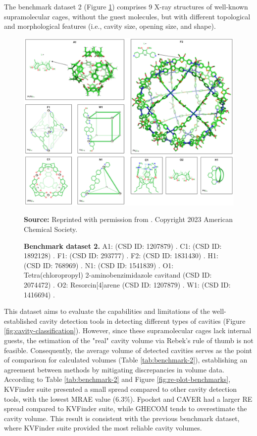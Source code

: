 \documentclass[Ingles]{phdthesis}
\def\ie{i.e.\onedot}
\begin{document}
The benchmark dataset 2 (Figure \ref{fig:benchmark-dataset-2}) comprises 9 X-ray structures of well-known supramolecular cages, without the guest molecules, but with different topological and morphological features (\ie, cavity size, opening size, and shape).

\begin{figure}[ht]
  \centerline{\includegraphics[scale=1]{images/benchmark-dataset-2.png}}
  \centerline{\tiny{\textbf{Source:} Reprinted with permission from \cite{guerra2023B}. Copyright 2023 American Chemical Society.}}
  \caption[Benchmark dataset 2]{\textbf{Benchmark dataset 2.}
  A1:  (CSD ID: 1207879) \cite{macgillivray1997}.
  C1:  (CSD ID: 1892128) \cite{kawakami2019}.
  F1:  (CSD ID: 293777) \cite{yoshizawa2006}.
  F2:  (CSD ID: 1831430) \cite{fujita2016}.
  H1:  (CSD ID: 768969) \cite{liao2010}.
  N1:  (CSD ID: 1541839) \cite{ronson2017}.
  O1: Tetra(chloropropyl) 2-aminobenzimidazole cavitand (CSD ID: 2074472) \cite{zhang2021}.
  O2: Resorcin[4]arene (CSD ID: 1207879) \cite{macgillivray1997}.
  W1:  (CSD ID: 1416694) \cite{cullen2016}.}
  \label{fig:benchmark-dataset-2}
\end{figure}

This dataset aims to evaluate the capabilities and limitations of the well-established cavity detection tools in detecting different types of cavities (Figure \ref{fig:cavity-classification}). However, since these supramolecular cages lack internal guests, the estimation of the "real" cavity volume via Rebek's rule of thumb is not feasible. Consequently, the average volume of detected cavities serves as the point of comparison for calculated volumes (Table \ref{tab:benchmark-2}), establishing an agreement between methods by mitigating discrepancies in volume data. According to Table \ref{tab:benchmark-2} and Figure \ref{fig:re-plot-benchmarks}, KVFinder suite presented a small spread
compared to other cavity detection tools, with the lowest \acs{MRAE} value (6.3\%). Fpocket and CAVER had a larger \acs{RE} spread compared to KVFinder suite, while GHECOM tends to overestimate the cavity volume. This result is consistent with the previous benchmark dataset, where KVFinder suite provided the most reliable cavity volumes.
\end{document}

